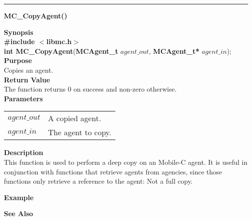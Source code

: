 \noindent
\vspace{5pt}
\rule{6.5in}{0.015in}
\noindent
{}
{\LARGE \bf MC\_CopyAgent()}\\

\noindent
{\bf Synopsis}\\
{\bf \#include $<$libmc.h$>$}\\
{\bf int MC\_CopyAgent}({\bf MCAgent\_t} $agent\_out$, {\bf MCAgent\_t*} $agent\_in$);\\

\noindent
{\bf Purpose}\\
Copies an agent.\\

\noindent
{\bf Return Value}\\
The function returns 0 on success and non-zero otherwise.\\

\noindent
{\bf Parameters}
\vspace{-0.1in}
\begin{description}
\item
\begin{tabular}{p{10 mm}p{145 mm}} 
$agent\_out$ & A copied agent. \\
$agent\_in$ & The agent to copy.
\end{tabular}
\end{description}

\noindent
{\bf Description}\\
This function is used to perform a deep copy on an Mobile-C agent. It is useful
in conjunction with functions that retrieve agents from agencies, since
those functions only retrieve a reference to the agent: Not a full copy. 

\noindent
{\bf Example}\\
\noindent
{\footnotesize}

\noindent
{\bf See Also}\\

